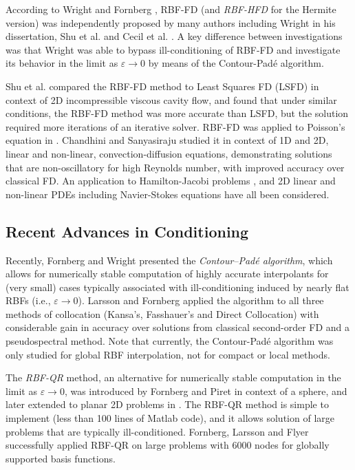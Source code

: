 \documentclass{report}
\begin{document}
{According to Wright and Fornberg \cite{Wright2004}, RBF-FD (and \emph{RBF-HFD} for the Hermite version) was independently 
proposed by many authors including Wright \cite{Wright2003} in his dissertation, Shu et al. \cite{Shu2003} and Cecil et al. \cite{Cecil2004}. A key difference between investigations was that Wright \cite{Wright2003} was able to bypass ill-conditioning of RBF-FD and investigate its behavior in the limit as $\varepsilon \rightarrow 0$ by means of the Contour-Pad\'{e} algorithm.

Shu et al. \cite{Shu2006} compared the RBF-FD method to Least Squares FD (LSFD) in context of 2D incompressible viscous 
cavity flow, and found that under similar conditions, the RBF-FD method was more accurate than LSFD, but the solution required 
more iterations of an iterative solver. RBF-FD was applied to Poisson's 
equation in \cite{Wright2004}.  Chandhini and Sanyasiraju \cite{Chandhini2007} studied it in context of 1D and 2D, 
linear and non-linear, 
convection-diffusion equations, demonstrating solutions that are non-oscillatory for high Reynolds number, with improved 
accuracy over classical FD. An application to Hamilton-Jacobi problems \cite{Cecil2004}, and 2D linear and non-linear PDEs 
including Navier-Stokes equations \cite{Shu2003} have all been considered. 




\subsection{Recent Advances in Conditioning}

Recently, Fornberg and Wright 
\cite{Fornberg2004} presented the \emph{Contour--Pad\'{e} algorithm}, which allows for numerically stable 
computation of highly 
accurate interpolants for (very small) cases typically associated with ill-conditioning induced by nearly flat RBFs (i.e., $\varepsilon \rightarrow 0$). Larsson and Fornberg \cite{Larsson2003} 
applied the 
algorithm to all three methods of collocation (Kansa's, Fasshauer's and Direct Collocation) with considerable gain in accuracy over solutions from classical second-order FD and a pseudospectral method. Note that currently, the Contour-Pad\'{e} 
algorithm was only studied for global RBF interpolation, not for compact or local methods. 

The \emph{RBF-QR} method, an alternative for numerically stable computation in the limit as $\varepsilon \rightarrow 0$, was introduced by Fornberg  and 
Piret \cite{Fornberg2007} in context of a sphere, and later extended to planar 2D problems in \cite{Fornberg2009b}. The 
RBF-QR 
method is simple 
to implement (less than 100 lines of Matlab code), and it allows solution of large problems that are typically ill-conditioned. Fornberg, Larsson and Flyer \cite{Fornberg2009b} successfully applied RBF-QR on large problems with 6000 nodes for globally supported basis functions. 

}
\end{document}
